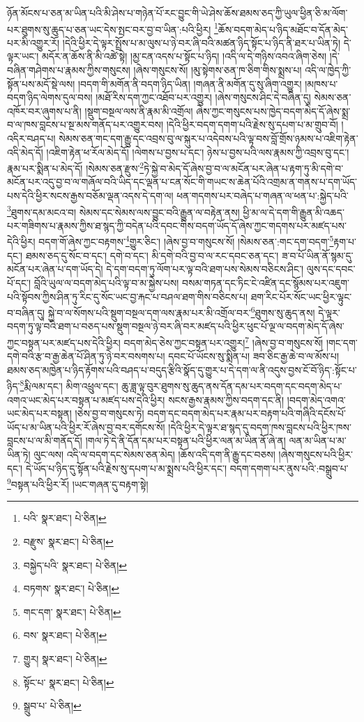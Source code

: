 ཉོན་མོངས་པ་ཅན་མ་ཡིན་པའི་མི་ཤེས་པ་གཉེན་པོ་རང་བྱུང་གི་ཡེ་ཤེས་ཆོས་ཐམས་ཅད་ཀྱི་ཡུལ་ཕྱིན་ཅི་མ་ལོག་པར་ཐུགས་སུ་ཆུད་པ་ཅན་ཡང་དེས་སྤང་བར་བྱ་བ་ཡིན་:པའི་ཕྱིར། \footnote{པའི་  སྣར་ཐང་།  པེ་ཅིན། }ཆོས་བདག་མེད་པ་ཉིད་མཐོང་བ་དོན་མེད་པར་མི་འགྱུར་རོ། །དེའི་ཕྱིར་དེ་ལྟར་སྤྲོས་པ་མ་ལུས་པ་ཉེ་བར་ཞི་བའི་མཚན་ཉིད་སྟོང་པ་ཉིད་ནི་ཐར་པ་ཡིན་ཏེ། དེ་ལྟར་ཡང་། མདོར་ན་ཆོས་ནི་མི་འཚེ་སྟེ། །མྱ་ངན་འདས་པ་སྟོང་པ་ཉིད། །འདི་ལ་དེ་གཉིས་འབའ་ཞིག་ཅེས། །དེ་བཞིན་གཤེགས་པ་རྣམས་ཀྱིས་གསུངས། །ཞེས་གསུངས་སོ། །མུ་སྟེགས་ཅན་ཁ་ཅིག་གིས་སྨྲས་པ། འདི་ལ་ཁྱེད་ཀྱི་སྟོན་པས་མདོ་སྡེ་ལས། །བདག་གི་མགོན་ནི་བདག་ཉིད་ཡིན། །གཞན་ནི་མགོན་དུ་སུ་ཞིག་འགྱུར། །མཁས་པ་བདག་ཉིད་ལེགས་དུལ་བས། །མཐོ་རིས་དག་ཀྱང་འཐོབ་པར་འགྱུར། །ཞེས་གསུངས་ཤིང་དེ་བཞིན་དུ། སེམས་ཅན་འཁོར་བར་ཞུགས་པ་ནི། །སྡུག་བསྔལ་ལས་ནི་རྣམ་མི་འགྲོལ། ཞེས་ཀྱང་གསུངས་པས་ཁྱེད་བདག་མེད་དོ་ཞེས་སྨྲ་བ་ལ་ཁས་བླངས་པ་སྔ་མས་གནོད་པར་འགྱུར་བས། །དེའི་ཕྱིར་བདག་དགག་པའི་རྗེས་སུ་དཔག་པ་མ་གྲུབ་བོ། །འདིར་བཤད་པ། སེམས་ཅན་གང་དག་རྒྱུ་དང་འབྲས་བུ་ལ་སྐུར་པ་འདེབས་པའི་ལྟ་བས་བློ་གྲོས་ཉམས་པ་འཇིག་རྟེན་འདི་མེད་དོ། །འཇིག་རྟེན་ཕ་རོལ་མེད་དོ། །ལེགས་པ་བྱས་པ་དང་། ཉེས་པ་བྱས་པའི་ལས་རྣམས་ཀྱི་འབྲས་བུ་དང་། རྣམ་པར་སྨིན་པ་མེད་དོ། །སེམས་ཅན་རྫུས་\footnote{བརྫུས་  སྣར་ཐང་།  པེ་ཅིན། }ཏེ་སྐྱེ་བ་མེད་དོ་ཞེས་བྱ་བ་ལ་མངོན་པར་ཞེན་པ་རྟག་ཏུ་མི་དགེ་བ་མངོན་པར་འདུ་བྱ་བ་ལ་གཞོལ་བའི་ཡིད་དང་ལྡན་པ་ངན་སོང་གི་གཡང་ས་ཆེན་པོའི་འགྲམ་ན་གནས་པ་དག་ཡོད་པས་དེའི་ཕྱིར་སངས་རྒྱས་བཅོམ་ལྡན་འདས་དེ་དག་ལ། ཕན་གདགས་པར་བཞེད་པ་གཞན་ལ་ཕན་པ་:སྐྱེད་པའི་\footnote{བསྐྱེད་པའི་  སྣར་ཐང་།  པེ་ཅིན། }ཐུགས་དམ་མངའ་བ། སེམས་དང་སེམས་ལས་བྱུང་བའི་རྒྱུན་ལ་བརྟེན་ནས། ཕྱི་མ་ལ་དེ་དག་གི་རྒྱུན་མི་འཆད་པར་གཟིགས་པ་རྣམས་ཀྱིས་ཐ་སྙད་ཀྱི་བདེན་པའི་དབང་གིས་བདག་ཡོད་དོ་ཞེས་ཀྱང་གདགས་པར་མཛད་པས་དེའི་ཕྱིར། བདག་གོ་ཞེས་ཀྱང་བརྟགས་\footnote{བཏགས་  སྣར་ཐང་།  པེ་ཅིན། }གྱུར་ཅིང་། །ཞེས་བྱ་བ་གསུངས་སོ། །སེམས་ཅན་:གང་དག་བདག་\footnote{གང་དག་  སྣར་ཐང་།  པེ་ཅིན། }རྟག་པ་དང་། ཐམས་ཅད་དུ་སོང་བ་དང་། དགེ་བ་དང་། མི་དགེ་བའི་བྱ་བ་ལ་རང་དབང་ཅན་དང་། ཟ་བ་པོ་ཡིན་ནོ་སྙམ་དུ་མངོན་པར་ཞེན་པ་དག་ཡོད་དེ། དེ་དག་བདག་ཏུ་ལོག་པར་ལྟ་བའི་ཐག་པས་སེམས་བཅིངས་ཤིང་། ལུས་དང་དབང་པོ་དང་། བློའི་ཡུལ་ལ་བདག་མེད་པའི་ལྟ་བ་མ་སྐྱེས་པས། བསམ་གཏན་དང་ཏིང་ངེ་འཛིན་དང་སྙོམས་པར་འཇུག་པའི་སྟོབས་ཀྱིས་ཤིན་ཏུ་རིང་དུ་སོང་ཡང་བྱ་རྐང་པ་བཤལ་ཐག་གིས་བཅིངས་པ། ཐག་རིང་པོར་སོང་ཡང་ཕྱིར་ལྟུང་བ་བཞིན་དུ། སྐྱེ་བ་ལ་སོགས་པའི་སྡུག་བསྔལ་དག་ལས་རྣམ་པར་མི་འགྲོལ་བར་\footnote{བས་  སྣར་ཐང་།  པེ་ཅིན། }ཐུགས་སུ་ཆུད་ནས། དེ་ལྟར་བདག་ཏུ་ལྟ་བའི་ཐག་པ་བཅད་པས་སྡུག་བསྔལ་ཉེ་བར་ཞི་བར་མཛད་པའི་ཕྱིར་ཕུང་པོ་ལྔ་ལ་བདག་མེད་དོ་ཞེས་ཀྱང་བསྟན་པར་མཛད་པས་དེའི་ཕྱིར། བདག་མེད་ཅེས་ཀྱང་བསྟན་པར་འགྱུར།\footnote{གྱུར།  སྣར་ཐང་།  པེ་ཅིན། } །ཞེས་བྱ་བ་གསུངས་སོ། །གང་དག་དགེ་བའི་རྩ་བ་རྒྱ་ཆེན་པོ་ཤིན་ཏུ་ཉེ་བར་བསགས་པ། དབང་པོ་ཡོངས་སུ་སྨིན་པ། ཟབ་ཅིང་རྒྱ་ཆེ་བ་ལ་མོས་པ། ཐམས་ཅད་མཁྱེན་པ་ཉིད་རྟོགས་པའི་བཤད་པ་བདུད་རྩིའི་སྣོད་དུ་གྱུར་པ་དེ་དག་ལ་ནི་འདུས་བྱས་ངོ་བོ་ཉིད་:སྟོང་པ་ཉིད་\footnote{སྟོང་པ་  སྣར་ཐང་།  པེ་ཅིན། }རྨི་ལམ་དང་། མིག་འཕྲུལ་དང་། ཆུ་ཟླ་ལྟ་བུར་ཐུགས་སུ་ཆུད་ནས་དོན་དམ་པར་བདག་དང་བདག་མེད་པ་འགའ་ཡང་མེད་པར་བསྟན་པ་མཛད་པས་དེའི་ཕྱིར། སངས་རྒྱས་རྣམས་ཀྱིས་བདག་དང་ནི། །བདག་མེད་འགའ་ཡང་མེད་པར་བསྟན། །ཅེས་བྱ་བ་གསུངས་ཏེ། བདག་དང་བདག་མེད་པར་རྣམ་པར་བརྟག་པའི་གཞིའི་དངོས་པོ་ཡོད་པ་མ་ཡིན་པའི་ཕྱིར་རོ་ཞེས་བྱ་བར་དགོངས་སོ། །དེའི་ཕྱིར་དེ་ལྟར་ཐ་སྙད་དུ་བདག་ཁས་བླངས་པའི་ཕྱིར་ཁས་བླངས་པ་ལ་མི་གནོད་དོ། །གལ་ཏེ་དེ་ནི་དོན་དམ་པར་བསྟན་པའི་ཕྱིར་ལན་མ་ཡིན་ནོ་ཞེ་ན། ལན་མ་ཡིན་པ་མ་ཡིན་ཏེ། ལུང་ལས། འདི་ལ་བདག་དང་སེམས་ཅན་མེད། །ཆོས་འདི་དག་ནི་རྒྱུ་དང་བཅས། །ཞེས་གསུངས་པའི་ཕྱིར་དང་། དེ་ཡོད་པ་ཉིད་དུ་སྟོན་པའི་རྗེས་སུ་དཔག་པ་མ་སྨྲས་པའི་ཕྱིར་དང་། བདག་དགག་པར་ནུས་པའི་:བསྒྲུབ་པ་\footnote{སྒྲུབ་པ་  པེ་ཅིན། }བསྟན་པའི་ཕྱིར་རོ། །ཡང་གཞན་དུ་བརྟག་སྟེ། 